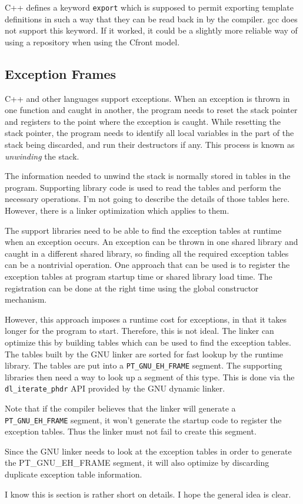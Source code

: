 C++ defines a keyword \texttt{export} which is supposed to permit exporting
template definitions in such a way that they can be read back in by the
compiler. gcc does not support this keyword. If it worked, it could be a
slightly more reliable way of using a repository when using the Cfront model.

\subsection{Exception Frames}

C++ and other languages support exceptions. When an exception is thrown in one
function and caught in another, the program needs to reset the stack pointer
and registers to the point where the exception is caught. While resetting the
stack pointer, the program needs to identify all local variables in the part of
the stack being discarded, and run their destructors if any. This process is
known as \emph{unwinding} the stack.

The information needed to unwind the stack is normally stored in tables in the
program. Supporting library code is used to read the tables and perform the
necessary operations. I'm not going to describe the details of those tables
here. However, there is a linker optimization which applies to them.

The support libraries need to be able to find the exception tables at runtime
when an exception occurs. An exception can be thrown in one shared library and
caught in a different shared library, so finding all the required exception
tables can be a nontrivial operation. One approach that can be used is to
register the exception tables at program startup time or shared library
load time. The registration can be done at the right time using the global
constructor mechanism.

However, this approach imposes a runtime cost for exceptions, in that it takes
longer for the program to start. Therefore, this is not ideal. The linker
can optimize this by building tables which can be used to find the exception
tables. The tables built by the GNU linker are sorted for fast lookup by the
runtime library. The tables are put into a \texttt{PT\_GNU\_EH\_FRAME} segment.
The supporting libraries then need a way to look up a segment of this type.
This is done via the \texttt{dl\_iterate\_phdr} API provided by the GNU dynamic
linker.

Note that if the compiler believes that the linker will generate a
\texttt{PT\_GNU\_EH\_FRAME} segment, it won't generate the startup code to
register the exception tables. Thus the linker must not fail to create this
segment.

Since the GNU linker needs to look at the exception tables in order to generate
the PT\_GNU\_EH\_FRAME segment, it will also optimize by discarding
duplicate exception table information.

I know this is section is rather short on details. I hope the general idea is
clear.
